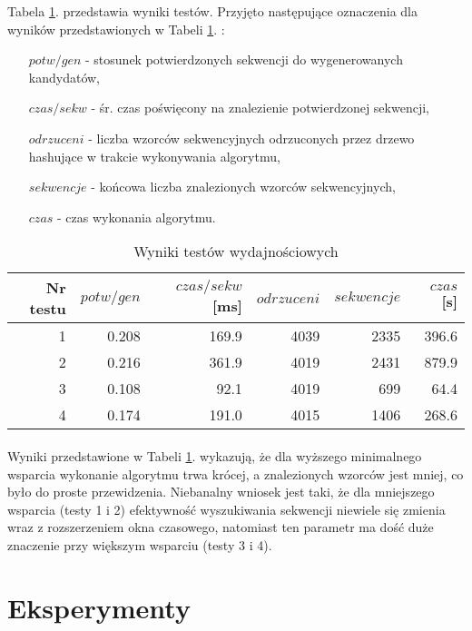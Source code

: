 \documentclass[11pt,a4paper]{article}
\begin{document}
Tabela \ref{tab:2}. przedstawia wyniki testów. Przyjęto następujące oznaczenia dla wyników przedstawionych w Tabeli \ref{tab:2}. :
\begin{itemize}
\item[$potw\slash gen$ - ]stosunek potwierdzonych sekwencji do wygenerowanych kandydatów,
\item[$czas\slash sekw$ - ]śr. czas poświęcony na znalezienie potwierdzonej sekwencji,
\item[$odrzuceni$ - ]liczba wzorców sekwencyjnych odrzuconych przez drzewo hashujące w trakcie wykonywania algorytmu,
\item[$sekwencje$ - ]końcowa liczba znalezionych wzorców sekwencyjnych,
\item[$czas$ - ]czas wykonania algorytmu.
\end{itemize}
\begin{table}[!hbt]
\caption{Wyniki testów wydajnościowych}
\centering
\begin{tabular}{|r|r|r|r|r|r|}
\hline
Nr testu	& $potw\slash gen$	& $czas\slash sekw$ [ms]	& $odrzuceni$	& $sekwencje$	& $czas$ [s]\\[1.2ex]\hline
1			& 0.208				& 169.9						& 4039			& 2335			& 396.6		\\[1ex]\hline
2			& 0.216				& 361.9						& 4019			& 2431			& 879.9		\\[1ex]\hline
3			& 0.108				& 92.1						& 4019			& 699			& 64.4		\\[1ex]\hline
4			& 0.174				& 191.0						& 4015			& 1406			& 268.6		\\[1ex]\hline
\end{tabular}
\label{tab:2}
\end{table}


\paragraph{}Wyniki przedstawione w Tabeli \ref{tab:2}. wykazują, że dla wyższego minimalnego wsparcia wykonanie algorytmu trwa krócej, a znalezionych wzorców jest mniej, co było do proste przewidzenia. Niebanalny wniosek jest taki, że dla mniejszego wsparcia (testy 1 i 2) efektywność wyszukiwania sekwencji niewiele się zmienia wraz z rozszerzeniem okna czasowego, natomiast ten parametr ma dość duże znaczenie przy większym wsparciu (testy 3 i 4).

\section{Eksperymenty}
\end{document}
